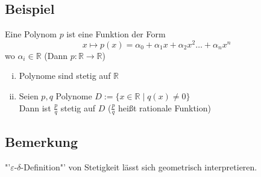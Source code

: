 \subsection{Beispiel} %
\label{sub:beispiel}
Eine Polynom $p$ ist eine Funktion der Form
\[
	x \mapsto p(x) = \alpha_0 + \alpha_1 x + \alpha_2 x^2\ldots + \alpha_n x^n
\]
wo $\alpha_i \in \mathds{R}$ (Dann $p: \mathds{R} \to \mathds{R}$)
\begin{enumerate}[(i)]
	\item Polynome sind stetig auf $\mathds{R}$
	\item Seien $p,q$ Polynome $D:= \{ x \in \mathds{R} \mid q(x) \not= 0\}$ \\
	Dann ist $\frac{p}{q}$ stetig auf $D$ ($\frac{p}{q}$ heißt rationale Funktion)
\end{enumerate}

\subsection{Bemerkung} %
\label{sub:bemerkung}
"'$\varepsilon$-$\delta$-Definition"' von Stetigkeit lässt sich geometrisch interpretieren.


